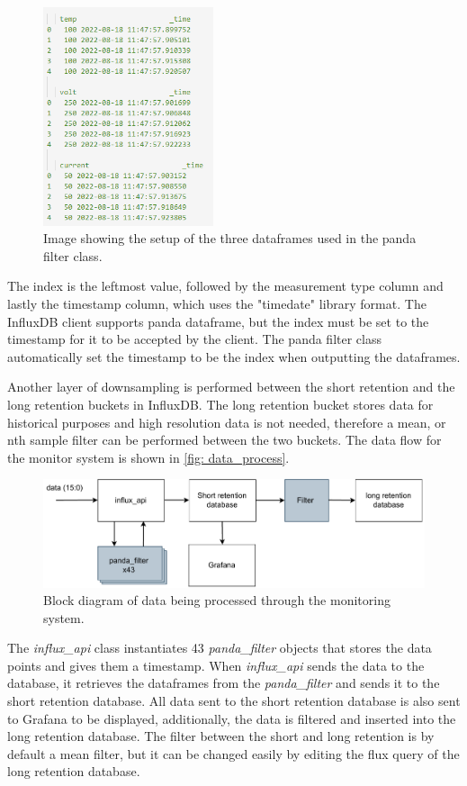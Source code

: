 \documentclass[main.tex]{subfiles}
\begin{document}
 \begin{figure}[!htpb]
    \centering
    \includegraphics[width=5cm, scale=1]{images/panda_frame_example.png}
    \caption{Image showing the setup of the three dataframes used in the panda filter class.}
    \label{fig: panda_example}
\end{figure}
\FloatBarrier 

The index is the leftmost value, followed by the measurement type column and lastly the timestamp column, which uses the "timedate" library format. The InfluxDB client supports panda dataframe, but the index must be set to the timestamp for it to be accepted by the client. The panda filter class automatically set the timestamp to be the index when outputting the dataframes.

Another layer of downsampling is performed between the short retention and the long retention buckets in InfluxDB. The long retention bucket stores data for historical purposes and high resolution data is not needed, therefore a mean, or nth sample filter can be performed between the two buckets. The data flow for the monitor system is shown in \autoref{fig: data_process}.

 \begin{figure}[!htpb]
    \centering
    \includegraphics[width=18cm, scale=1]{images/processing data overview.pdf}
    \caption{Block diagram of data being processed through the monitoring system.}
    \label{fig: data_process}
\end{figure}
\FloatBarrier 

The \textit{influx\_api} class instantiates 43 \textit{panda\_filter} objects that stores the data points and gives them a timestamp. When \textit{influx\_api} sends the data to the database, it retrieves the dataframes from the \textit{panda\_filter} and sends it to the short retention database. All data sent to the short retention database is also sent to Grafana to be displayed, additionally, the data is filtered and inserted into the long retention database. The filter between the short and long retention is by default a mean filter, but it can be changed easily by editing the flux query of the long retention database.

 

 
\end{document}
